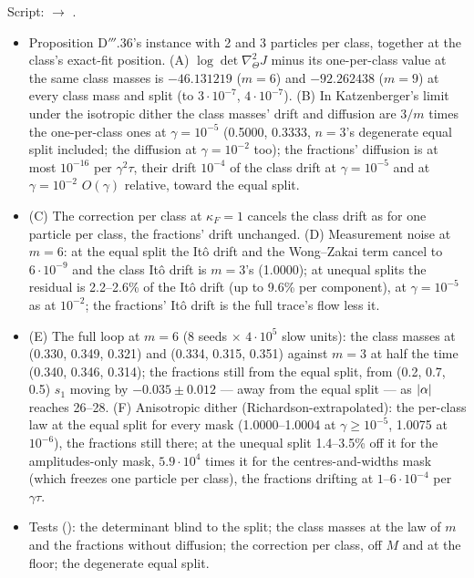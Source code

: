 Script:  $\to$ .
\begin{itemize}
  \item Proposition D$'''$.36's instance with 2 and 3 particles per class, together at the class's exact-fit position.
    (A) $\log\det\nabla^2_\Theta J$ minus its one-per-class value at the same class masses is $-46.131219$ ($m = 6$) and
    $-92.262438$ ($m = 9$) at every class mass and split (to $3\cdot10^{-7}$, $4\cdot10^{-7}$). (B) In Katzenberger's
    limit under the isotropic dither the class masses' drift and diffusion are $3/m$ times the one-per-class ones at
    $\gamma = 10^{-5}$ (0.5000, 0.3333, $n = 3$'s degenerate equal split included; the diffusion at $\gamma = 10^{-2}$
    too); the fractions' diffusion is at most $10^{-16}$ per $\gamma^2\tau$, their drift $10^{-4}$ of the class drift at
    $\gamma = 10^{-5}$ and at $\gamma = 10^{-2}$ $O(\gamma)$ relative, toward the equal split.
  \item (C) The correction per class at $\kappa_F = 1$ cancels the class drift as for one particle per class, the
    fractions' drift unchanged. (D) Measurement noise at $m = 6$: at the equal split the It\^o drift and the Wong--Zakai
    term cancel to $6\cdot10^{-9}$ and the class It\^o drift is $m = 3$'s (1.0000); at unequal splits the residual is
    2.2--2.6\% of the It\^o drift (up to 9.6\% per component), at $\gamma = 10^{-5}$ as at $10^{-2}$; the fractions' It\^o
    drift is the full trace's flow less it.
  \item (E) The full loop at $m = 6$ (8 seeds $\times$ $4\cdot10^5$ slow units): the class masses at
    (0.330, 0.349, 0.321) and (0.334, 0.315, 0.351) against $m = 3$ at half the time (0.340, 0.346, 0.314); the
    fractions still from the equal split, from (0.2, 0.7, 0.5) $s_1$ moving by $-0.035\pm0.012$ --- away from the
    equal split --- as $\lvert \alpha\rvert$ reaches 26--28. (F) Anisotropic dither (Richardson-extrapolated): the per-class law
    at the equal split for every mask (1.0000--1.0004 at $\gamma\ge10^{-5}$, 1.0075 at $10^{-6}$), the fractions still
    there; at the unequal split 1.4--3.5\% off it for the amplitudes-only mask, $5.9\cdot10^4$ times it for the
    centres-and-widths mask (which freezes one particle per class), the fractions drifting at $1$--$6\cdot10^{-4}$ per
    $\gamma\tau$.
  \item Tests (): the determinant blind to the split; the class masses at the law of
    $m$ and the fractions without diffusion; the correction per class, off $M$ and at the floor; the degenerate equal
    split.
\end{itemize}

